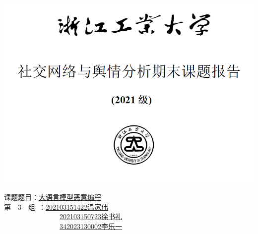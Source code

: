 \documentclass{article} %
\begin{document}
\begin{titlepage}
    \begin{center}
        \vspace*{1cm}

        \includegraphics[width=\textwidth]{title.png}

        \vspace{1.5cm}

        \vspace{0.5cm}
        \LARGE
        \begin{flushleft}
		    \Large\hspace{2cm}课题题目：\underline{大语言模型恶意编程}\\
		    \Large\hspace{2cm}第\ \ 3\ \ 组\ ：\underline{202103151422\space\space 温家伟}\\
		    \Large\hspace{2cm}\ \ \ \ \ \ \ \ \ \ \ \ \ \ \ \ \underline{202103150723\space\space 徐书礼}\\    	
		    \Large\hspace{2cm}\ \ \ \ \ \ \ \ \ \ \ \ \ \ \ \ \underline{342023130002\space\space 李乐一}    	
        \end{flushleft}


        \vfill

    \end{center}
\end{titlepage}

\clearpage %
\end{document}
